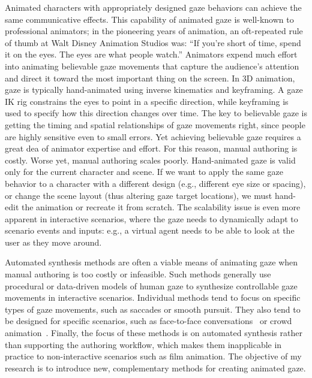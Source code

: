 Animated characters with appropriately designed gaze behaviors can achieve the same communicative effects. This capability of animated gaze is well-known to professional animators; in the pioneering years of animation, an oft-repeated rule of thumb at Walt Disney Animation Studios was: ``If you're short of time, spend it on the eyes. The eyes are what people watch.'' Animators expend much effort into animating believable gaze movements that capture the audience’s attention and direct it toward the most important thing on the screen. In 3D animation, gaze is typically hand-animated using inverse kinematics and keyframing. A gaze IK rig constrains the eyes to point in a specific direction, while keyframing is used to specify how this direction changes over time. The key to believable gaze is getting the timing and spatial relationships of gaze movements right, since people are highly sensitive even to small errors. Yet achieving believable gaze requires a great dea of animator expertise and effort. For this reason, manual authoring is costly. Worse yet, manual authoring scales poorly. Hand-animated gaze is valid only for the current character and scene. If we want to apply the same gaze behavior to a character with a different design (e.g., different eye size or spacing), or change the scene layout (thus altering gaze target locations), we must hand-edit the animation or recreate it from scratch. The scalability issue is even more apparent in interactive scenarios, where the gaze needs to dynamically adapt to scenario events and inputs: e.g., a virtual agent needs to be able to look at the user as they move around.

Automated synthesis methods are often a viable means of animating gaze when manual authoring is too costly or infeasible.
Such methods generally use procedural or data-driven models of human gaze to synthesize controllable gaze movements in interactive scenarios. Individual methods tend to focus on specific types of gaze movements, such as saccades or smooth pursuit. They also tend to be designed for specific scenarios, such as face-to-face conversations~\cite{a few conv. gaze papers} or crowd animation~\cite{crowd gaze}. Finally, the focus of these methods is on automated synthesis rather than supporting the authoring workflow, which makes them inapplicable in practice to non-interactive scenarios such as film animation. The objective of my research is to introduce new, complementary methods for creating animated gaze.



